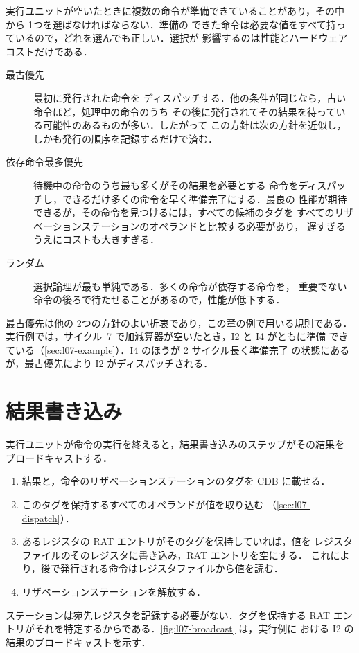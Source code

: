 \documentclass[../main.tex]{subfiles}
\begin{document}
実行ユニットが空いたときに複数の命令が準備できていることがあり，その中
から 1つを選ばなければならない．準備の
できた命令は必要な値をすべて持っているので，どれを選んでも正しい．選択が
影響するのは性能とハードウェアコストだけである．
\begin{description}
  \item[最古優先]最初に発行された命令を
    ディスパッチする．他の条件が同じなら，古い命令ほど，処理中の命令のうち
    その後に発行されてその結果を待っている可能性のあるものが多い．したがって
    この方針は次の方針を近似し，しかも発行の順序を記録するだけで済む．
  \item[依存命令最多優先] 待機中の命令のうち最も多くがその結果を必要とする
    命令をディスパッチし，できるだけ多くの命令を早く準備完了にする．最良の
    性能が期待できるが，その命令を見つけるには，すべての候補のタグを
    すべてのリザベーションステーションのオペランドと比較する必要があり，
    遅すぎるうえにコストも大きすぎる．
  \item[ランダム] 選択論理が最も単純である．多くの命令が依存する命令を，
    重要でない命令の後ろで待たせることがあるので，性能が低下する．
\end{description}
最古優先は他の 2つの方針のよい折衷であり，この章の例で用いる規則である．
実行例では，サイクル~7 で加減算器が空いたとき，I2 と I4 がともに準備
できている（\cref{sec:l07-example}）．I4 のほうが 2 サイクル長く準備完了
の状態にあるが，最古優先により I2 がディスパッチされる．

\section{結果書き込み}
\label{sec:l07-write}

実行ユニットが命令の実行を終えると，結果書き込みのステップがその結果を
ブロードキャストする．
\begin{enumerate}
  \item 結果と，命令のリザベーションステーションのタグを CDB に載せる．
  \item このタグを保持するすべてのオペランドが値を取り込む
    （\cref{sec:l07-dispatch}）．
  \item あるレジスタの RAT エントリがそのタグを保持していれば，値を
    レジスタファイルのそのレジスタに書き込み，RAT エントリを空にする．
    これにより，後で発行される命令はレジスタファイルから値を読む．
  \item リザベーションステーションを解放する．
\end{enumerate}
ステーションは宛先レジスタを記録する必要がない．タグを保持する RAT
エントリがそれを特定するからである．\cref{fig:l07-broadcast} は，実行例に
おける I2 の結果のブロードキャストを示す．
\end{document}

